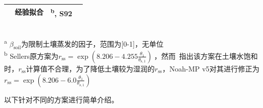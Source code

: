 {\begin{landscape}
\begin{table}[htbp]
\begin{tabular}{@{}clll@{}}
                                                                                                & 经验拟合                                                                                                                                            & \citet{s1992}\textsuperscript{b}, S92 \\ \bottomrule
      \end{tabular}
      \footnotesize                                                                            \\
      \textsuperscript{a} $\beta_{\mathrm{soil}}$为限制土壤蒸发的因子，范围为{[}0-1{]}，无单位 \\
      \textsuperscript{b} Sellers原方案为$r_{\mathrm{ss}} = \exp\left( 8.206 - 4.255\frac{\theta_{\mathrm{1}}}{\theta_{\mathrm{s,1}}} \right)\ $，然而~\citet{sz2009}指出该方案在土壤水饱和时，$r_{\mathrm{ss}}$计算值不合理，为了降低土壤较为湿润的$r_{\mathrm{ss}}$，Noah-MP v5对其进行修正为$r_{\mathrm{ss}} = \exp\left( 8.206 - 6.0 \frac{{\theta}_{\mathrm{1}}}{\theta_{\mathrm{s,1}}} \right)$
    \end{table}
  \end{landscape}
}

以下针对不同的方案进行简单介绍。

